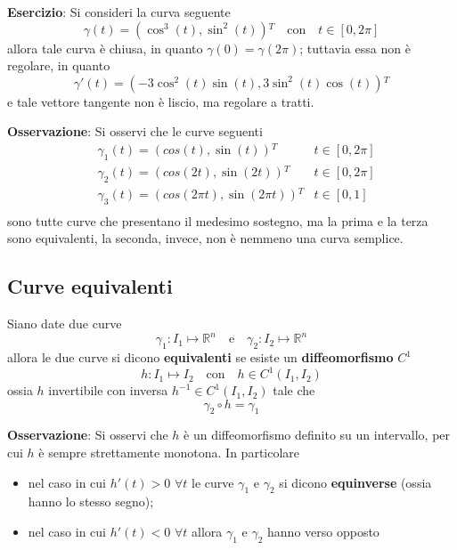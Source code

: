 \documentclass[a4paper]{extarticle}
\begin{document}
\vspace{2em}
\noindent
\textbf{Esercizio}: Si consideri la curva seguente
\[\gamma(t) = \left(\cos^3(t),\sin^2(t)\right){^T} \hspace{1em} \text{con} \hspace{1em} t \in [0,2\pi]\]
allora tale curva è chiusa, in quanto $\gamma(0)=\gamma(2\pi)$; tuttavia essa non è regolare, in quanto
\[\gamma'(t) = (- 3 \cos^2(t) \sin(t), 3 \sin^2(t) \cos(t)){^T}\]
e tale vettore tangente non è liscio, ma regolare a tratti.

\vspace{2em}
\noindent
\textbf{Osservazione}: Si osservi che le curve seguenti
\begin{align*}
    &\gamma_1(t) = (cos(t),\sin(t)){^T} & t \in [0,2\pi]\\
    &\gamma_2(t) = (cos(2t),\sin(2t)){^T} & t \in [0,2\pi]\\
    &\gamma_3(t) = (cos(2 \pi t),\sin(2 \pi t)){^T} & t \in [0,1]\\
\end{align*}
sono tutte curve che presentano il medesimo sostegno, ma la prima e la terza sono equivalenti, la seconda, invece, non è nemmeno una curva semplice.

\vspace{1em}
\subsection{Curve equivalenti}
Siano date due curve
\[\gamma_1 : I_1 \longmapsto \mathbb{R}^n \hspace{1em} \text{e} \hspace{1em} \gamma_2 : I_2 \longmapsto \mathbb{R}^n\]
allora le due curve si dicono \textbf{equivalenti} se esiste un \textbf{diffeomorfismo} $C^1$
\[h : I_1 \longmapsto I_2 \hspace{1em} \text{con} \hspace{1em} h \in C^1(I_1,I_2)\]
ossia $h$ invertibile con inversa $h^{-1} \in C^{1}(I_1,I_2)
$ tale che
\[\gamma_2 \circ h = \gamma_1\]

\vspace{2em}
\noindent
\textbf{Osservazione}: Si osservi che $h$ è un diffeomorfismo definito su un intervallo, per cui $h$ è sempre strettamente monotona. In particolare
\begin{itemize}
    \item nel caso in cui $h'(t) > 0$ $\forall t$ le curve $\gamma_1$ e $\gamma_2$ si dicono \textbf{equinverse} (ossia hanno lo stesso segno);
    \item nel caso in cui $h'(t) < 0$ $\forall t$ allora $\gamma_1$ e $\gamma_2$ hanno verso opposto
\end{itemize}
\end{document}
